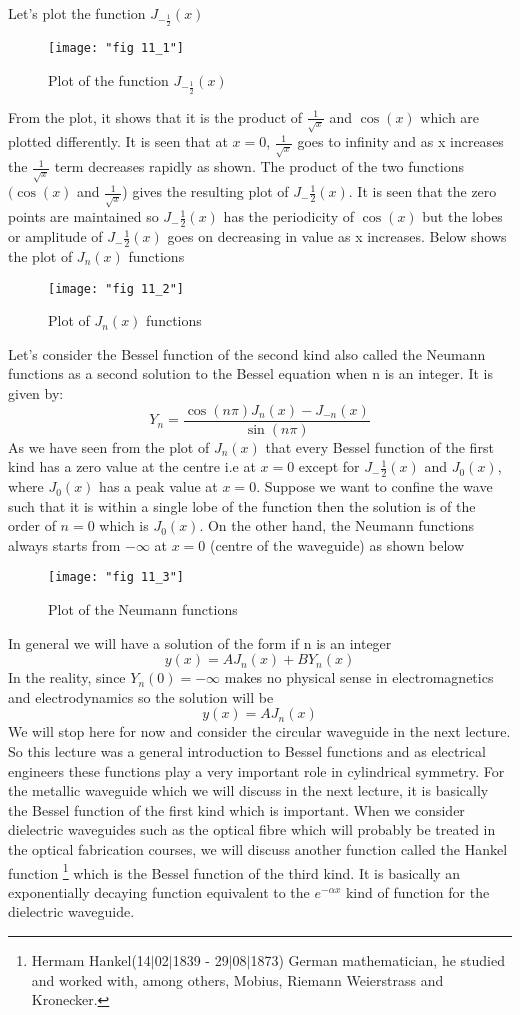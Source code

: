 	Let's plot the function $ J_{-\frac{1}{2}}(x)$
		\begin{figure}[H]
			\centering
			\texttt{[image: "fig 11\_1"]}
			\caption{ Plot of the function $ J_{-\frac{1}{2}}(x)$}
			\label{fig:fig-1}
		\end{figure}
	From the plot, it shows that it is the product of $\frac{1}{\sqrt{x}}$ and $\cos(x)$ which are plotted differently. It is seen that at $x=0$, $\frac{1}{\sqrt{x}}$ goes to infinity and as x increases the $\frac{1}{\sqrt{x}}$ term decreases rapidly as shown. The product of the two functions $(\cos(x)$ and $\frac{1}{\sqrt{x}}$) gives the resulting plot of $J_-{\frac{1}{2}}(x)$. It is seen that the zero points are maintained so $J_-{\frac{1}{2}}(x)$ has the periodicity of $\cos(x)$ but the lobes or amplitude of $J_-{\frac{1}{2}}(x)$ goes on decreasing in value as x increases. Below shows the plot of $J_n(x)$ functions
	\begin{figure}[H]
	\centering
	\texttt{[image: "fig 11\_2"]}
	\caption{ Plot of $J_n(x)$ functions}
	\label{fig:fig-2}
\end{figure}
	Let's consider the Bessel function of the second kind also called the Neumann functions as a second solution to the Bessel equation when n is an integer. It is given by: 
	$$Y_n = \frac{\cos(n\pi) J_n(x) - J_{-n}(x)}{\sin(n\pi)}$$
	As we have seen from the plot of $J_n(x)$ that every Bessel function of the first kind has a zero value at the centre i.e at $x= 0$ except for $J_-{\frac{1}{2}}(x)$ and $J_0(x)$, where $J_0(x)$ has a peak value at $ x= 0$. Suppose we want to confine the wave such that it is within a single lobe of the function then the solution is of the order of $n =0$ which is $J_0(x)$. On the other hand, the Neumann functions always starts from $-\infty$ at $x=0$ (centre of the waveguide) as shown below
		\begin{figure}[H]
			\centering
			\texttt{[image: "fig 11\_3"]}
			\caption{ Plot of the Neumann functions}
			\label{fig:fig-3}
		\end{figure}
	In general we will have a solution of the form if n is an integer
	$$y(x) = AJ_n(x) + B Y_n(x)$$
	In the reality, since $Y_n(0) = -\infty$ makes no physical sense in electromagnetics and electrodynamics so the solution will be 
	$$y(x) = AJ_n(x)$$
	We will stop here for now and consider the circular waveguide in the next lecture. So this lecture was a general introduction to Bessel functions and as electrical engineers these functions play a very important role in cylindrical symmetry. For the metallic waveguide which we will discuss in the next lecture, it is basically the Bessel function of the first kind which is important. When we consider dielectric waveguides such as the optical fibre which will probably be treated in the optical fabrication courses, we will discuss another function called the Hankel function 
	\footnote{Hermam Hankel(14$|$02$|$1839 - 29$|$08$|$1873) German mathematician, he studied and worked with, among others, Mobius, Riemann Weierstrass and Kronecker.}
	which is the Bessel function of the third kind. It is basically an exponentially decaying function equivalent to the $e^{-\alpha x}$ kind of function for the dielectric waveguide.